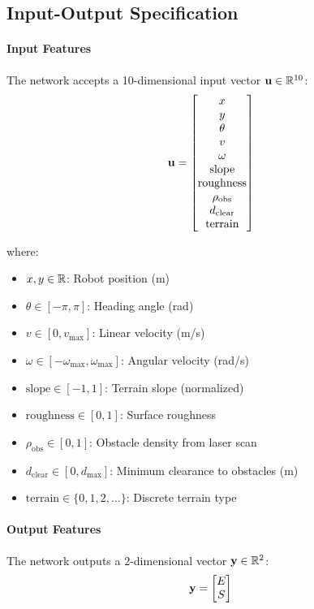 \subsection{Input-Output Specification}

\paragraph{Input Features}
The network accepts a 10-dimensional input vector $\mathbf{u} \in \mathbb{R}^{10}$:
\begin{equation}
\mathbf{u} = \begin{bmatrix}
x \\ y \\ \theta \\ v \\ \omega \\ \text{slope} \\ \text{roughness} \\ \rho_{\text{obs}} \\ d_{\text{clear}} \\ \text{terrain}
\end{bmatrix}
\label{eq:pinn_input}
\end{equation}

where:
\begin{itemize}
    \item $x, y \in \mathbb{R}$: Robot position (m)
    \item $\theta \in [-\pi, \pi]$: Heading angle (rad)
    \item $v \in [0, v_{\max}]$: Linear velocity (m/s)
    \item $\omega \in [-\omega_{\max}, \omega_{\max}]$: Angular velocity (rad/s)
    \item $\text{slope} \in [-1, 1]$: Terrain slope (normalized)
    \item $\text{roughness} \in [0, 1]$: Surface roughness
    \item $\rho_{\text{obs}} \in [0, 1]$: Obstacle density from laser scan
    \item $d_{\text{clear}} \in [0, d_{\max}]$: Minimum clearance to obstacles (m)
    \item $\text{terrain} \in \{0, 1, 2, \ldots\}$: Discrete terrain type
\end{itemize}

\paragraph{Output Features}
The network outputs a 2-dimensional vector $\mathbf{y} \in \mathbb{R}^2$:
\begin{equation}
\mathbf{y} = \begin{bmatrix}
E \\ S
\end{bmatrix}
\label{eq:pinn_output}
\end{equation}

